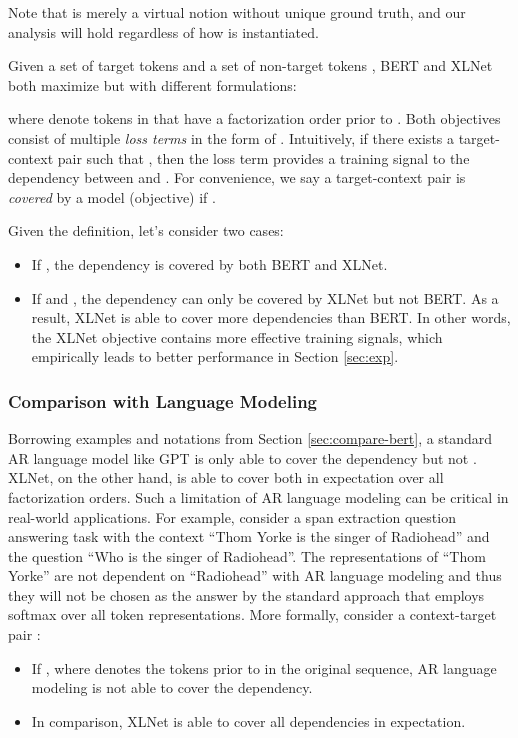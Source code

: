 \documentclass{article}
\begin{document}
Note that  is merely a virtual notion without unique ground truth, and our analysis will hold regardless of how  is instantiated. 

Given a set of target tokens  and a set of non-target tokens , BERT and XLNet both maximize  but with different formulations:

where  denote tokens in  that have a factorization order prior to . 
Both objectives consist of multiple \textit{loss terms} in the form of . 
Intuitively, if there exists a target-context pair  such that , then the loss term  provides a training signal to the dependency between  and .
For convenience, we say a target-context pair  is \textit{covered} by a model (objective) if .

Given the definition, let's consider two cases:
\begin{itemize}[leftmargin=*,topsep=0em,itemsep=0em]
	\item If , the dependency  is covered by both BERT and XLNet.
	\item If  and , the dependency can only be covered by XLNet but not BERT. 
	As a result, XLNet is able to cover more dependencies than BERT. 
	In other words, the XLNet objective contains more effective training signals, which empirically leads to better performance in Section \ref{sec:exp}.
\end{itemize}

\subsubsection{Comparison with Language Modeling} \label{sec:compare-lm}

Borrowing examples and notations from Section \ref{sec:compare-bert}, a standard AR language model like GPT \cite{radford2018improving} is only able to cover the dependency  but not . XLNet, on the other hand, is able to cover both in expectation over all factorization orders. Such a limitation of AR language modeling can be critical in real-world applications. For example, consider a span extraction question answering task with the context ``Thom Yorke is the singer of Radiohead'' and the question ``Who is the singer of Radiohead''. The representations of ``Thom Yorke'' are not dependent on ``Radiohead'' with AR language modeling and thus they will not be chosen as the answer by the standard approach that employs softmax over all token representations. More formally, consider a context-target pair :
\begin{itemize}[leftmargin=*,topsep=0em,itemsep=0em]
	\item If , where  denotes the tokens prior to  in the original sequence, AR language modeling is not able to cover the dependency.
	\item In comparison, XLNet is able to cover all dependencies in expectation.
\end{itemize}
\end{document}

